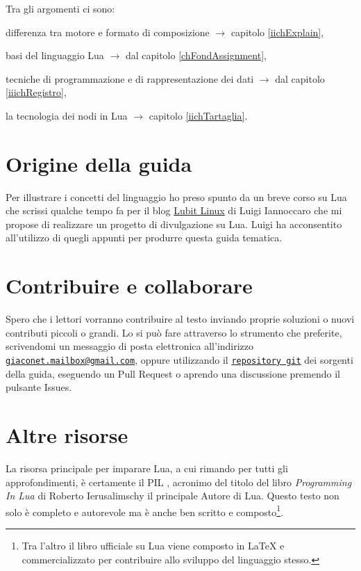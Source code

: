 Tra gli argomenti ci sono:
\begin{compactitemize}
\item differenza tra motore e formato di composizione \( \to \) capitolo
\ref{iichExplain},
\item basi del linguaggio Lua \( \to \) dal capitolo \ref{chFondAssignment},
\item tecniche di programmazione e di rappresentazione dei dati \( \to \) dal
capitolo \ref{iiichRegistro},
\item la tecnologia dei nodi in Lua \( \to \) capitolo \ref{iichTartaglia}.
\end{compactitemize}


\section{Origine della guida}

Per illustrare i concetti del linguaggio ho preso spunto da un breve corso su
Lua che scrissi qualche tempo fa per il blog
\href{http://parliamodi-ubuntu.blogspot.it}{Lubit Linux} di Luigi Iannoccaro
che mi propose di realizzare un progetto di divulgazione su Lua. Luigi ha
acconsentito all'utilizzo di quegli appunti per produrre questa guida tematica.


\section{Contribuire e collaborare}

Spero che i lettori vorranno contribuire al testo inviando proprie soluzioni o
nuovi contributi piccoli o grandi. Lo si può fare attraverso lo strumento che
preferite, scrivendomi un messaggio di posta elettronica all'indirizzo
\href{mailto:giaconet.mailbox@gmail.com}{\texttt{giaconet.mailbox@gmail.com}},
oppure utilizzando il
\href{https://github.com/GuITeX/guidalua}{\texttt{repository git}} dei sorgenti
della guida, eseguendo un Pull Request o aprendo una discussione premendo il
pulsante Issues.


\section{Altre risorse}

La risorsa principale per imparare Lua, a cui rimando per tutti gli
approfondimenti, è certamente il PIL \cite{PIL}, acronimo del titolo del libro
\emph{Programming In Lua} di Roberto Ierusalimschy il principale Autore di Lua.
Questo testo non solo è completo e autorevole ma è anche ben scritto e
composto\footnote{Tra l'altro il libro ufficiale su Lua viene composto in
\LaTeX{} e commercializzato per contribuire allo sviluppo del linguaggio
stesso.}.

